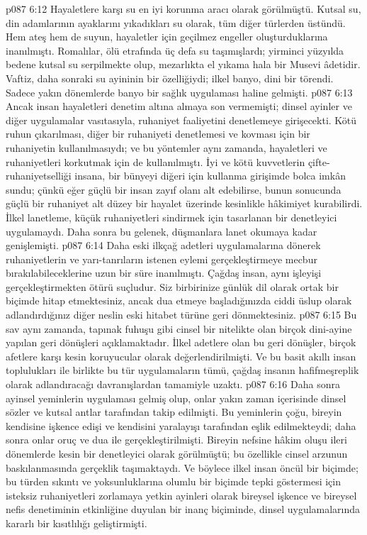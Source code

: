 \vs p087 6:12 Hayaletlere karşı su en iyi korunma aracı olarak görülmüştü. Kutsal su, din adamlarının ayaklarını yıkadıkları su olarak, tüm diğer türlerden üstündü. Hem ateş hem de suyun, hayaletler için geçilmez engeller oluşturduklarına inanılmıştı. Romalılar, ölü etrafında üç defa su taşımışlardı; yirminci yüzyılda bedene kutsal su serpilmekte olup, mezarlıkta el yıkama hala bir Musevi âdetidir. Vaftiz, daha sonraki su ayininin bir özelliğiydi; ilkel banyo, dini bir törendi. Sadece yakın dönemlerde banyo bir sağlık uygulaması haline gelmişti.
\vs p087 6:13 Ancak insan hayaletleri denetim altına almaya son vermemişti; dinsel ayinler ve diğer uygulamalar vasıtasıyla, ruhaniyet faaliyetini denetlemeye girişecekti. Kötü ruhun çıkarılması, diğer bir ruhaniyeti denetlemesi ve kovması için bir ruhaniyetin kullanılmasıydı; ve bu yöntemler aynı zamanda, hayaletleri ve ruhaniyetleri korkutmak için de kullanılmıştı. İyi ve kötü kuvvetlerin çifte\hyp{}ruhaniyetselliği insana, bir bünyeyi diğeri için kullanma girişimde bolca imkân sundu; çünkü eğer güçlü bir insan zayıf olanı alt edebilirse, bunun sonucunda güçlü bir ruhaniyet alt düzey bir hayalet üzerinde kesinlikle hâkimiyet kurabilirdi. İlkel lanetleme, küçük ruhaniyetleri sindirmek için tasarlanan bir denetleyici uygulamaydı. Daha sonra bu gelenek, düşmanlara lanet okumaya kadar genişlemişti.
\vs p087 6:14 Daha eski ilkçağ adetleri uygulamalarına dönerek ruhaniyetlerin ve yarı\hyp{}tanrıların istenen eylemi gerçekleştirmeye mecbur bırakılabileceklerine uzun bir süre inanılmıştı. Çağdaş insan, aynı işleyişi gerçekleştirmekten ötürü suçludur. Siz birbirinize günlük dil olarak ortak bir biçimde hitap etmektesiniz, ancak dua etmeye başladığınızda ciddi üslup olarak adlandırdığınız diğer neslin eski hitabet türüne geri dönmektesiniz.
\vs p087 6:15 Bu sav aynı zamanda, tapınak fuhuşu gibi cinsel bir nitelikte olan birçok dini\hyp{}ayine yapılan geri dönüşleri açıklamaktadır. İlkel adetlere olan bu geri dönüşler, birçok afetlere karşı kesin koruyucular olarak değerlendirilmişti. Ve bu basit akıllı insan toplulukları ile birlikte bu tür uygulamaların tümü, çağdaş insanın hafifmeşreplik olarak adlandıracağı davranışlardan tamamiyle uzaktı.
\vs p087 6:16 Daha sonra ayinsel yeminlerin uygulaması gelmiş olup, onlar yakın zaman içerisinde dinsel sözler ve kutsal antlar tarafından takip edilmişti. Bu yeminlerin çoğu, bireyin kendisine işkence edişi ve kendisini yaralayışı tarafından eşlik edilmekteydi; daha sonra onlar oruç ve dua ile gerçekleştirilmişti. Bireyin nefsine hâkim oluşu ileri dönemlerde kesin bir denetleyici olarak görülmüştü; bu özellikle cinsel arzunun baskılanmasında gerçeklik taşımaktaydı. Ve böylece ilkel insan öncül bir biçimde; bu türden sıkıntı ve yoksunluklarına olumlu bir biçimde tepki göstermesi için isteksiz ruhaniyetleri zorlamaya yetkin ayinleri olarak bireysel işkence ve bireysel nefis denetiminin etkinliğine duyulan bir inanç biçiminde, dinsel uygulamalarında kararlı bir kısıtlılığı geliştirmişti.
